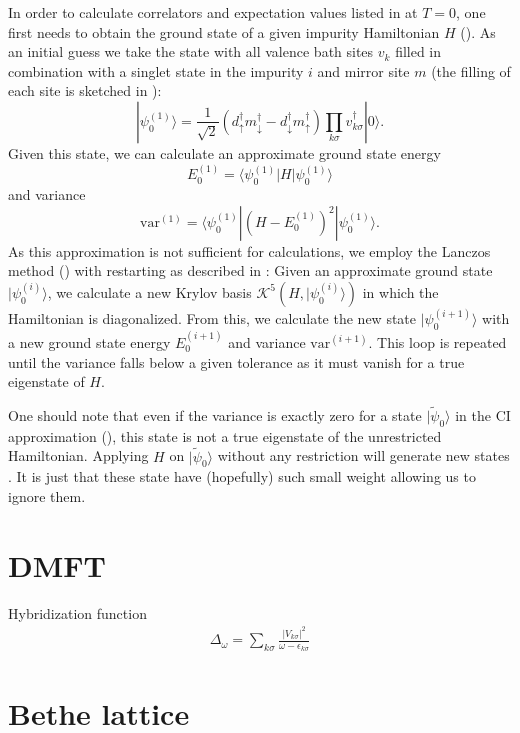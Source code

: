 In order to calculate correlators and expectation values listed in
 at $T=0$,
one first needs to obtain the ground state of a given impurity Hamiltonian $H$
().
As an initial guess we take the state with all valence bath sites $v_k$ filled in combination with
a singlet state in the impurity $i$ and mirror site $m$
(the filling of each site is sketched in ):
\begin{equation}
    |\psi_0^{(1)}\rangle
    =
    \frac{1}{\sqrt{2}}
    (d^\dag_\uparrow m^\dag_\downarrow - d^\dag_\downarrow m^\dag_\uparrow)
    \prod_{k\sigma} v^\dag_{k\sigma}
    |0\rangle.
\end{equation}
Given this state, we can calculate an approximate ground state energy
\begin{equation}
    E_0^{(1)} = \langle \psi_0^{(1)} | H | \psi_0^{(1)} \rangle
\end{equation}
and variance
\begin{equation}
    \mathrm{var}^{(1)} = \langle \psi_0^{(1)} | (H - E_0^{(1)})^2 | \psi_0^{(1)} \rangle.
\end{equation}
As this approximation is not sufficient for calculations,
we employ the Lanczos method () with restarting
as described in \cite{Lu2014}:
Given an approximate ground state $|\psi_0^{(i)}\rangle$,
we calculate a new Krylov basis $\mathcal{K}^5(H, |\psi_0^{(i)}\rangle)$ in which
the Hamiltonian is diagonalized.
From this, we calculate the new state $|\psi_0^{(i+1)}\rangle$
with a new ground state energy $E_0^{(i+1)}$
and variance $\mathrm{var}^{(i+1)}$.
This loop is repeated until the variance falls below a given tolerance
as it must vanish for a true eigenstate of $H$.

One should note that even if the variance is exactly zero for a state $|\tilde\psi_0\rangle$
in the CI approximation (),
this state is not a true eigenstate of the unrestricted Hamiltonian.
Applying $H$ on $|\tilde\psi_0\rangle$ without any restriction
will generate new states \cite{Lu2014}.
It is just that these state have (hopefully) such small weight allowing us to ignore them.

\section{DMFT}

Hybridization function
\begin{align}
    \Delta_\omega = \sum_{k\sigma} \frac{|V_{k\sigma}|^2}{\omega - \epsilon_{k\sigma}}
\end{align}

\section{Bethe lattice}
